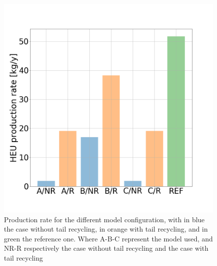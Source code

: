 \begin{figure}[h!] %
    \centering
    \includegraphics[scale=0.25]{HEU_prod_rate}
    \caption{Production rate for the different model configuration, with in blue
    the case without tail recycling, in orange with tail recycling, and in green
    the reference one. Where A-B-C represent the model used, and NR-R
    respectively the case without tail recycling and the case with tail recycling}
    \label{fig:HEU_rate}
\end{figure}
